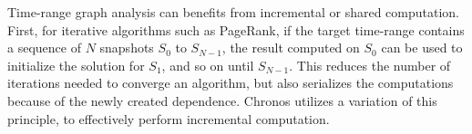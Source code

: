 \documentclass{svjour3}
\begin{document}



\vspace{2mm}

 Time-range graph analysis can benefits from incremental or shared computation. First, for iterative algorithms such as PageRank, if the target time-range contains a sequence of $N$ snapshots $S_0$ to $S_{N-1}$, the result computed on $S_0$ can be used to initialize the solution for $S_1$, and so on until $S_{N-1}$. This reduces the number of iterations needed to converge an algorithm, but also serializes the computations because of the newly created dependence. Chronos utilizes a variation of this principle, to effectively perform incremental computation. 
\end{document}
